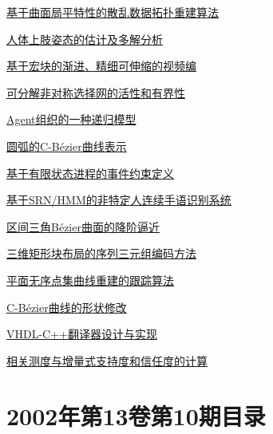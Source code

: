 \documentclass[a4paper]{article}
\begin{document}
\href{http://www.jos.org.cn/ch/reader/download_pdf.aspx?file_no=20021110&year_id=2002&quarter_id=11&falg=1}{基于曲面局平特性的散乱数据拓扑重建算法}

\href{http://www.jos.org.cn/ch/reader/download_pdf.aspx?file_no=20021111&year_id=2002&quarter_id=11&falg=1}{人体上肢姿态的估计及多解分析}

\href{http://www.jos.org.cn/ch/reader/download_pdf.aspx?file_no=20021112&year_id=2002&quarter_id=11&falg=1}{基于宏块的渐进、精细可伸缩的视频编}

\href{http://www.jos.org.cn/ch/reader/download_pdf.aspx?file_no=20021113&year_id=2002&quarter_id=11&falg=1}{可分解非对称选择网的活性和有界性}

\href{http://www.jos.org.cn/ch/reader/download_pdf.aspx?file_no=20021114&year_id=2002&quarter_id=11&falg=1}{Agent组织的一种递归模型}

\href{http://www.jos.org.cn/ch/reader/download_pdf.aspx?file_no=20021115&year_id=2002&quarter_id=11&falg=1}{圆弧的C-Bézier曲线表示}

\href{http://www.jos.org.cn/ch/reader/download_pdf.aspx?file_no=20021116&year_id=2002&quarter_id=11&falg=1}{基于有限状态进程的事件约束定义}

\href{http://www.jos.org.cn/ch/reader/download_pdf.aspx?file_no=20021117&year_id=2002&quarter_id=11&falg=1}{基于SRN/HMM的非特定人连续手语识别系统}

\href{http://www.jos.org.cn/ch/reader/download_pdf.aspx?file_no=20021118&year_id=2002&quarter_id=11&falg=1}{区间三角Bézier曲面的降阶逼近}

\href{http://www.jos.org.cn/ch/reader/download_pdf.aspx?file_no=20021119&year_id=2002&quarter_id=11&falg=1}{三维矩形块布局的序列三元组编码方法}

\href{http://www.jos.org.cn/ch/reader/download_pdf.aspx?file_no=20021120&year_id=2002&quarter_id=11&falg=1}{平面无序点集曲线重建的跟踪算法}

\href{http://www.jos.org.cn/ch/reader/download_pdf.aspx?file_no=20021121&year_id=2002&quarter_id=11&falg=1}{C-Bézier曲线的形状修改}

\href{http://www.jos.org.cn/ch/reader/download_pdf.aspx?file_no=20021122&year_id=2002&quarter_id=11&falg=1}{VHDL-C++翻译器设计与实现}

\href{http://www.jos.org.cn/ch/reader/download_pdf.aspx?file_no=20021123&year_id=2002&quarter_id=11&falg=1}{相关测度与增量式支持度和信任度的计算}


\section{\textbf{2002年第13卷第10期目录}}
\end{document}
